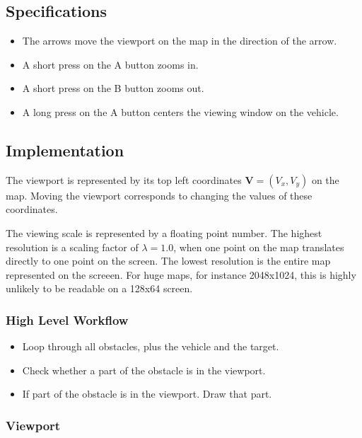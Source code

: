 \documentclass[11pt]{article}
\newcommand{\Vb}{\mathbf{V}}
\begin{document}
\subsection{Specifications}
\label{sec-map-specifications}

\begin{itemize}
    \item The arrows move the viewport on the map in the direction of the
        arrow.
    \item A short press on the A button zooms in.
    \item A short press on the B button zooms out.
    \item A long  press on the A button centers the viewing window on the
        vehicle.
\end{itemize}

\subsection{Implementation}
\label{sec-map-implementation}

The viewport is represented by its top left coordinates $\Vb=(V_{x}, V_{y})$ 
on the map. Moving the viewport corresponds to changing the values of these
coordinates.

The viewing scale is represented by a floating point number. The highest
resolution is a scaling factor of $\lambda=1.0$, when one point on the map 
translates directly to one point on the screen. The lowest resolution is the
entire map represented on the screeen. For huge maps, for instance 
2048x1024, this is highly unlikely to be readable on a 128x64 screen.

\subsubsection{High Level Workflow}
\label{sec-map-implementation-workflow}
    
\begin{itemize}
    \item Loop through all obstacles, plus the vehicle and the target.
    \item Check whether a part of the obstacle is in the viewport.
    \item If part of the obstacle is in the viewport. Draw that part.
\end{itemize}

\subsubsection{Viewport}
\label{sec-map-implementation-viewport}
\end{document}
